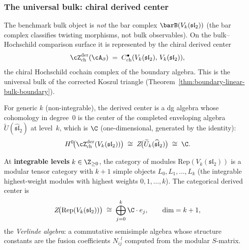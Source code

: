 \subsubsection{The universal bulk: chiral derived center}
\label{subsubsec:benchmark-derived-center}

The benchmark bulk object is \emph{not} the bar complex
$\barB(V_k(\mathfrak{sl}_2))$ (the bar complex classifies twisting
morphisms, not bulk observables). On the bulk--Hochschild comparison
surface it is represented by the chiral derived center
\begin{equation}\label{eq:benchmark-derived-center}
 \cZ^{\mathrm{der}}_{\mathrm{ch}}(\cA_\partial)
 \;=\;
 C^\bullet_{\mathrm{ch}}(V_k(\mathfrak{sl}_2),\,
 V_k(\mathfrak{sl}_2)),
\end{equation}
the chiral Hochschild cochain complex of the boundary algebra.
This is the universal bulk of the corrected Koszul triangle
(Theorem~\ref{thm:boundary-linear-bulk-boundary}).

For generic $k$ (non-integrable), the derived center is
a dg algebra whose cohomology in degree~$0$ is the center of the
completed enveloping algebra $\widetilde{U}(\widehat{\mathfrak{sl}}_2)$
at level~$k$, which is $\C$ (one-dimensional, generated by the
identity):
\begin{equation}\label{eq:benchmark-center-generic}
 H^0\!\bigl(\cZ^{\mathrm{der}}_{\mathrm{ch}}(V_k(\mathfrak{sl}_2))\bigr)
 \;\cong\;
 Z\!\bigl(\widetilde{U}_k(\widehat{\mathfrak{sl}}_2)\bigr)
 \;\cong\;
 \C.
\end{equation}

At \textbf{integrable levels} $k \in \Z_{\ge 0}$, the category
of modules $\mathrm{Rep}(V_k(\mathfrak{sl}_2))$ is a modular
tensor category with $k + 1$ simple objects
$L_0, L_1, \ldots, L_k$ (the integrable highest-weight modules
with highest weights $0, 1, \ldots, k$). The categorical
derived center is
\begin{equation}\label{eq:benchmark-center-integrable}
 Z\!\bigl(\mathrm{Rep}(V_k(\mathfrak{sl}_2))\bigr)
 \;\cong\;
 \bigoplus_{j=0}^k \C \cdot e_j,
 \qquad \dim = k + 1,
\end{equation}
the \emph{Verlinde algebra}: a commutative semisimple algebra
whose structure constants are the fusion coefficients
$N_{ij}^{\;\;l}$ computed from the modular $S$-matrix.

